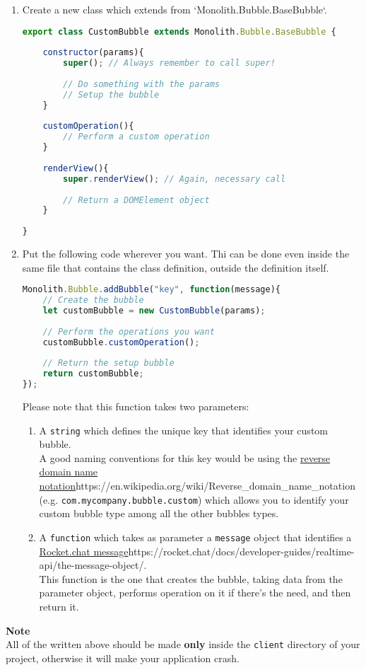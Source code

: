 \begin{enumerate}
	\item Create a new class which extends from `Monolith.Bubble.BaseBubble`.
\begin{lstlisting}[language=JavaScript]
export class CustomBubble extends Monolith.Bubble.BaseBubble {
    
    constructor(params){
        super(); // Always remember to call super!
        
        // Do something with the params
        // Setup the bubble
    }
    
    customOperation(){
        // Perform a custom operation
    }
    
    renderView(){
        super.renderView(); // Again, necessary call
        
        // Return a DOMElement object
    }
    
}
\end{lstlisting}

	\item Put the following code wherever you want. Thi can be done even inside the same file that contains the class definition, outside the definition itself.
\begin{lstlisting}[language=JavaScript]
Monolith.Bubble.addBubble("key", function(message){
    // Create the bubble
    let customBubble = new CustomBubble(params);
    
    // Perform the operations you want
    customBubble.customOperation();
    
    // Return the setup bubble
    return customBubble;
});
\end{lstlisting}
Please note that this function takes two parameters:
	\begin{enumerate}
		\item A \texttt{string} which defines the unique key that identifies your custom bubble.   \\
   		A good naming conventions for this key would be using the \url{reverse domain name notation}{https://en.wikipedia.org/wiki/Reverse_domain_name_notation} (e.g. \texttt{com.mycompany.bubble.custom}) which allows you to identify your custom bubble type among all the other bubbles types.
		\item A \texttt{function} which takes as parameter a \texttt{message} object that identifies a \url{Rocket.chat message}{https://rocket.chat/docs/developer-guides/realtime-api/the-message-object/}.  \\
   This function is the one that creates the bubble, taking data from the parameter object, performs operation on it if there's the need, and then return it.
   \end{enumerate}
\end{enumerate}   
   
\textbf{Note} \\
All of the written above should be made \textbf{only} inside the \texttt{client} directory of your  project, otherwise it will make your application crash.

\newpage